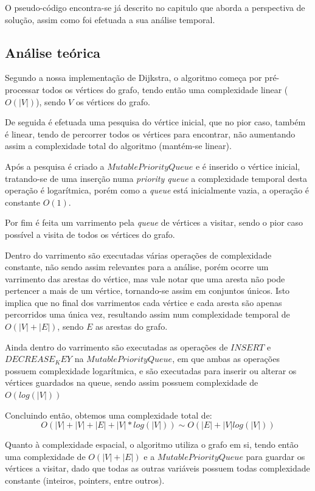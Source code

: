 \documentclass[article, a4paper, 12pt, oneside]{memoir}
\begin{document}
O pseudo-código encontra-se já descrito no capitulo que aborda a perspectiva de solução, assim como foi efetuada a sua análise temporal.
\subsection{Análise teórica}
Segundo a nossa implementação de Dijkstra, o algoritmo começa por pré-processar todos os vértices do grafo, tendo então uma complexidade linear ($O(|V|)$), sendo $V$ os vértices do grafo.

De seguida é efetuada uma pesquisa do vértice inicial, que no pior caso, também é linear, tendo de percorrer todos os vértices para encontrar, não aumentando assim a complexidade total do algoritmo (mantém-se linear).

Após a pesquisa é criado a $MutablePriorityQueue$ e é inserido o vértice inicial, tratando-se de uma inserção numa \emph{priority queue} a complexidade temporal desta operação é logarítmica, porém como a \emph{queue} está inicialmente vazia, a operação é constante $O(1)$.

Por fim é feita um varrimento pela \emph{queue} de vértices a visitar, sendo o pior caso possível a visita de todos os vértices do grafo.

Dentro do varrimento são executadas várias operações de complexidade constante, não sendo assim relevantes para a análise, porém ocorre um varrimento das arestas do vértice, mas vale notar que uma aresta não pode pertencer a mais de um vértice, tornando-se assim em conjuntos únicos. Isto implica que no final dos varrimentos cada vértice e cada aresta são apenas percorridos uma única vez, resultando assim num complexidade temporal de $O(|V|+|E|)$, sendo $E$ as arestas do grafo.

Ainda dentro do varrimento são executadas as operações de $INSERT$ e $DECREASE_KEY$ na $MutablePriorityQueue$, em que ambas as operações possuem complexidade logarítmica, e são executadas para inserir ou alterar os vértices guardados na queue, sendo assim possuem complexidade de $O(log(|V|))$

Concluindo então, obtemos uma complexidade total de:
\begin{equation}
O(|V| + |V| + |E| + |V|*log(|V|)) \sim O(|E|+|V|log(|V|))
\end{equation}

Quanto à complexidade espacial, o algoritmo utiliza o grafo em si, tendo então uma complexidade de $O(|V|+|E|)$ e a $MutablePriorityQueue$ para guardar os vértices a visitar, dado que todas as outras variáveis possuem todas complexidade constante (inteiros, pointers, entre outros).
\end{document}

